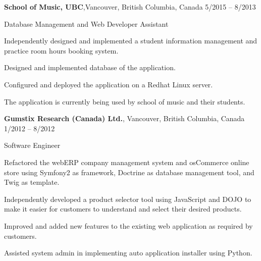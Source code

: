 \documentclass[10pt]{article}
\newcommand{\halfblankline}{\quad\vspace{-0.5\baselineskip}\pagebreak[3]}
\begin{document}
\textbf{School of Music, UBC},Vancouver, British Columbia, Canada \hfill 	5/2015 -- 8/2013
\begin{outerlist}
\item[] Database Management and Web Developer Assistant
\begin{innerlist}
\item Independently designed and implemented a student information management and practice room hours booking system.
\item Designed and implemented database of the application. 
\item Configured and deployed the application on a Redhat Linux server.
\item The application is currently being used by school of music and their students.
\end{innerlist}
\end{outerlist}

\halfblankline

\textbf{Gumstix Research (Canada) Ltd.}, Vancouver, British Columbia, Canada \hfill 	1/2012 -- 8/2012
\begin{outerlist}
\item[] Software Engineer
\begin{innerlist}
\item Refactored the webERP company management system and osCommerce online store using Symfony2 as framework, Doctrine as database management tool, and Twig as template.
\item Independently developed a product selector tool using JavaScript and DOJO to make it easier for customers to understand and select their desired products.
\item Improved and added new features to the existing web application as required by customers.
\item Assisted system admin in implementing auto application installer using Python.
\end{innerlist}
\end{outerlist}
\end{document}
